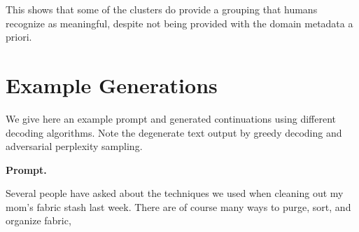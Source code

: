 \documentclass{article}
\newcommand{\myparagraph}[1]{\par\noindent\textbf{{#1}.}} %
\theoremstyle{definition}
\begin{document}
This shows that some of the clusters do provide a grouping that humans recognize as meaningful, despite not being provided with the domain metadata a priori. %

\section{Example Generations} \label{supp:example-gens}
%

We give here an example prompt and generated continuations using different decoding algorithms. Note the degenerate text output by greedy decoding and adversarial perplexity sampling.


\myparagraph{Prompt}

\begin{displayquote}
{\small
Several people have asked about the techniques we used when cleaning out my mom's fabric stash last week. There are of course many ways to purge, sort, and organize fabric,
}
\end{displayquote}
\end{document}
